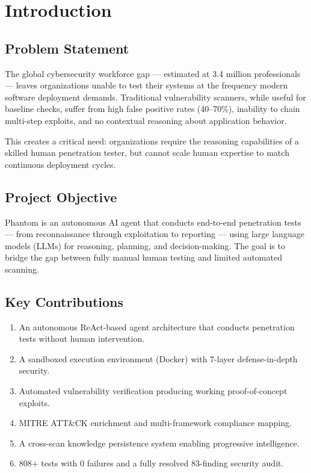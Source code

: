 \documentclass[12pt,a4paper]{report}
\begin{document}
\tableofcontents
\newpage
{}


\chapter{Introduction}

\section{Problem Statement}

The global cybersecurity workforce gap --- estimated at 3.4 million professionals --- leaves organizations unable to test their systems at the frequency modern software deployment demands. Traditional vulnerability scanners, while useful for baseline checks, suffer from high false positive rates (40--70\%), inability to chain multi-step exploits, and no contextual reasoning about application behavior.

This creates a critical need: organizations require the reasoning capabilities of a skilled human penetration tester, but cannot scale human expertise to match continuous deployment cycles.

\section{Project Objective}

Phantom is an autonomous AI agent that conducts end-to-end penetration tests --- from reconnaissance through exploitation to reporting --- using large language models (LLMs) for reasoning, planning, and decision-making. The goal is to bridge the gap between fully manual human testing and limited automated scanning.

\section{Key Contributions}

\begin{enumerate}
    \item An autonomous ReAct-based agent architecture that conducts penetration tests without human intervention.
    \item A sandboxed execution environment (Docker) with 7-layer defense-in-depth security.
    \item Automated vulnerability verification producing working proof-of-concept exploits.
    \item MITRE ATT\&CK enrichment and multi-framework compliance mapping.
    \item A cross-scan knowledge persistence system enabling progressive intelligence.
    \item 808+ tests with 0 failures and a fully resolved 83-finding security audit.
\end{enumerate}
\end{document}
